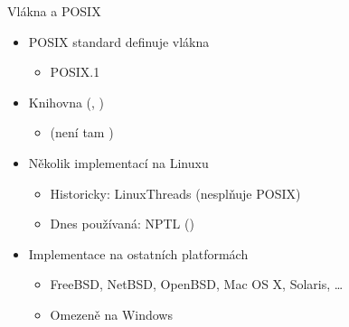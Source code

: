 \begin{frame}{Vlákna a POSIX}

  \begin{itemize}
    \item POSIX standard definuje vlákna
    \begin{itemize}
      \item POSIX.1
    \end{itemize}

    \pause

    \item Knihovna  (, )
    \begin{itemize}
      \item {} (není tam )
    \end{itemize}

    \pause

    \item Několik implementací na Linuxu
    \begin{itemize}
      \item Historicky: LinuxThreads (nesplňuje POSIX)
      \item Dnes používaná: NPTL ()
    \end{itemize}

    \pause

    \item Implementace na ostatních platformách
    \begin{itemize}
      \item FreeBSD, NetBSD, OpenBSD, Mac OS X, Solaris, \dots
      \item Omezeně na Windows
    \end{itemize}
 \end{itemize}

\end{frame}


